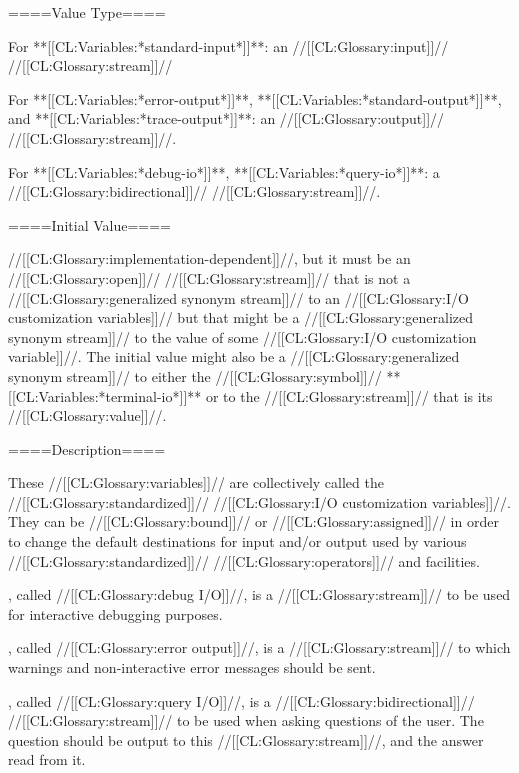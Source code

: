 
====Value Type====

For **[[CL:Variables:*standard-input*]]**: an //[[CL:Glossary:input]]// //[[CL:Glossary:stream]]//

For **[[CL:Variables:*error-output*]]**, **[[CL:Variables:*standard-output*]]**, and **[[CL:Variables:*trace-output*]]**: an //[[CL:Glossary:output]]// //[[CL:Glossary:stream]]//.

For **[[CL:Variables:*debug-io*]]**, **[[CL:Variables:*query-io*]]**: a //[[CL:Glossary:bidirectional]]// //[[CL:Glossary:stream]]//.

====Initial Value====

//[[CL:Glossary:implementation-dependent]]//, but it must be an //[[CL:Glossary:open]]// //[[CL:Glossary:stream]]// that is not a //[[CL:Glossary:generalized synonym stream]]// to an //[[CL:Glossary:I/O customization variables]]// but that might be a //[[CL:Glossary:generalized synonym stream]]// to the value of some //[[CL:Glossary:I/O customization variable]]//. The initial value might also be a //[[CL:Glossary:generalized synonym stream]]// to either the //[[CL:Glossary:symbol]]// **[[CL:Variables:*terminal-io*]]** or to the //[[CL:Glossary:stream]]// that is its //[[CL:Glossary:value]]//.

====Description====

These //[[CL:Glossary:variables]]// are collectively called the //[[CL:Glossary:standardized]]// //[[CL:Glossary:I/O customization variables]]//. They can be //[[CL:Glossary:bound]]// or //[[CL:Glossary:assigned]]// in order to change the default destinations for input and/or output used by various //[[CL:Glossary:standardized]]// //[[CL:Glossary:operators]]// and facilities.

, called //[[CL:Glossary:debug I/O]]//, is a //[[CL:Glossary:stream]]// to be used for interactive debugging purposes.

, called //[[CL:Glossary:error output]]//, is a //[[CL:Glossary:stream]]// to which warnings and non-interactive error messages should be sent.

, called //[[CL:Glossary:query I/O]]//, is a //[[CL:Glossary:bidirectional]]// //[[CL:Glossary:stream]]// to be used when asking questions of the user. The question should be output to this //[[CL:Glossary:stream]]//, and the answer read from it.


